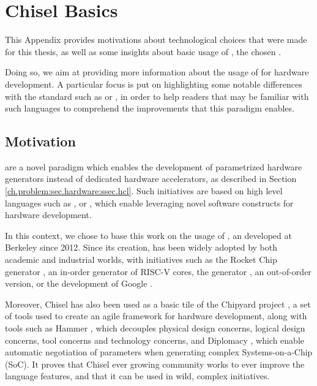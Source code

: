 \chapter{Chisel Basics}
    This Appendix provides motivations about technological choices that were made for this thesis, as well as some insights about basic usage of \chisel, the chosen .

    Doing so, we aim at providing more information about the usage of  for hardware development.
    A particular focus is put on highlighting some notable differences with the standard  such as \vhdl{} or \verilog{}, in order to help readers that may be familiar with such languages to comprehend the improvements that this paradigm enables.

    \section*{Motivation}
         are a novel paradigm which enables the development of parametrized hardware generators instead of dedicated hardware accelerators, as described in Section \ref{ch.problem:sec.hardware:ssec.hcl}.
        Such initiatives are based on high level languages such as \python{} \cite{lockhart_pymtl_2014}, \haskell{} \cite{baaij_clash_2010} or \scala{} \cite{bachrach_chisel_2012}, which enable leveraging novel software constructs for hardware development.

        In this context, we chose to base this work on the usage of , an  developed at Berkeley since 2012.
        Since its creation, \chisel{} has been widely adopted by both academic and industrial worlds, with initiatives such as the Rocket Chip generator \cite{asanovic_rocket_2016}, an in-order generator of RISC-V cores, the  generator \cite{celio_berkeley_2015}, an out-of-order version, or the development of Google  \cite{google_tpu_2018}.

        Moreover, Chisel has also been used as a basic tile of the Chipyard project \cite{chipyard_berkeley}, a set of tools used to create an agile framework for hardware development, along with tools such as Hammer \cite{wang_hammer_2018}, which decouples physical design concerns, logical design concerns, tool concerns and technology concerns, and Diplomacy \cite{cook_diplomatic_2017}, which enable automatic negotiation of parameters when generating complex Systems-on-a-Chip (SoC).
        It proves that Chisel ever growing community works to ever improve the language features, and that it can be used in wild, complex initiatives.

